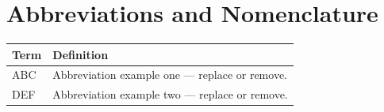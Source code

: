 
\section*{Abbreviations and Nomenclature}

\begin{tabularx}{\linewidth}{@{}p{2.5cm}X@{}}
\toprule
\textbf{Term} & \textbf{Definition} \\
\midrule
ABC  & Abbreviation example one --- replace or remove. \\
DEF  & Abbreviation example two --- replace or remove. \\
\bottomrule
\end{tabularx}
